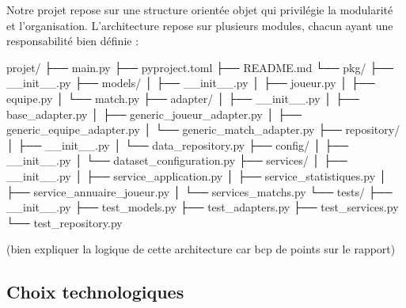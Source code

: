 \documentclass[
  french,
  letterpaper,
  DIV=11,
  numbers=noendperiod]{scrartcl}
\newenvironment{Shaded}{\begin{snugshade}}{\end{snugshade}}
\newcommand{\NormalTok}[1]{\textcolor[rgb]{0.00,0.23,0.31}{#1}}
\begin{document}
Notre projet repose sur une structure orientée objet qui privilégie la
modularité et l'organisation. L'architecture repose sur plusieurs
modules, chacun ayant une responsabilité bien définie :

\begin{Shaded}
\begin{Highlighting}[]

\NormalTok{projet/}
\NormalTok{├── main.py}
\NormalTok{├── pyproject.toml}
\NormalTok{├── README.md}
\NormalTok{└── pkg/}
\NormalTok{    ├── \_\_init\_\_.py}
\NormalTok{    ├── models/}
\NormalTok{    │   ├── \_\_init\_\_.py}
\NormalTok{    │   ├── joueur.py}
\NormalTok{    │   ├── equipe.py}
\NormalTok{    │   └── match.py}
\NormalTok{    ├── adapter/}
\NormalTok{    │   ├── \_\_init\_\_.py}
\NormalTok{    │   ├── base\_adapter.py}
\NormalTok{    │   ├── generic\_joueur\_adapter.py}
\NormalTok{    │   ├── generic\_equipe\_adapter.py}
\NormalTok{    │   └── generic\_match\_adapter.py}
\NormalTok{    ├── repository/}
\NormalTok{    │   ├── \_\_init\_\_.py}
\NormalTok{    │   └── data\_repository.py}
\NormalTok{    ├── config/}
\NormalTok{    │   ├── \_\_init\_\_.py}
\NormalTok{    │   └── dataset\_configuration.py}
\NormalTok{    ├── services/}
\NormalTok{    │   ├── \_\_init\_\_.py}
\NormalTok{    │   ├── service\_application.py}
\NormalTok{    │   ├── service\_statistiques.py}
\NormalTok{    │   ├── service\_annuaire\_joueur.py}
\NormalTok{    │   └── services\_matchs.py}
\NormalTok{    └── tests/}
\NormalTok{        ├── \_\_init\_\_.py}
\NormalTok{        ├── test\_models.py}
\NormalTok{        ├── test\_adapters.py}
\NormalTok{        ├── test\_services.py}
\NormalTok{        └── test\_repository.py}
\end{Highlighting}
\end{Shaded}

(bien expliquer la logique de cette architecture car bcp de points sur
le rapport)

\subsection{Choix technologiques}\label{choix-technologiques}
\end{document}
